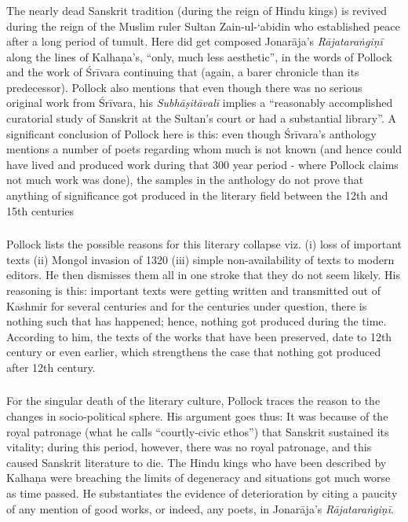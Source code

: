 \subsubsection{} The nearly dead Sanskrit tradition (during the reign of Hindu kings) is revived during the reign of the Muslim ruler Sultan Zain-ul-‘abidin who established peace after a long period of tumult. Here did get composed Jonarāja’s {\sl Rājataraṅgiṇī} along the lines of Kalhaṇa’s, “only, much less aesthetic”, in the words of Pollock and the work of Śrīvara continuing that (again, a barer chronicle than its predecessor). Pollock also mentions that even though there was no serious original work from Śrīvara, his {\sl Subhāṣitāvalī} implies a “reasonably accomplished curatorial study of Sanskrit at the Sultan’s court or had a substantial library”. A significant conclusion of Pollock here is this: even though Śrīvara’s anthology mentions a number of poets regarding whom much is not known (and hence could have lived and produced work during that 300 year period - where Pollock claims not much work was done), the samples in the anthology do not prove that anything of significance got produced in the literary field between the 12th and 15th centuries

\subsubsection{} Pollock lists the possible reasons for this literary collapse viz. (i) loss of important texts (ii) Mongol invasion of 1320 (iii) simple non-availability of texts to modern editors. He then dismisses them all in one stroke that they do not seem likely. His reasoning is this: important texts were getting written and transmitted out of Kashmir for several centuries and for the centuries under question, there is nothing such that has happened; hence, nothing got produced during the time. According to him, the texts of the works that have been preserved, date to 12th century or even earlier, which strengthens the case that nothing got produced after 12th century.

\subsubsection{} For the singular death of the literary culture, Pollock traces the reason to the changes in socio-political sphere. His argument goes thus: It was because of the royal patronage (what he calls “courtly-civic ethos”) that Sanskrit sustained its vitality; during this period, however, there was no royal patronage, and this caused Sanskrit literature to die. The Hindu kings who have been described by Kalhaṇa were breaching the limits of degeneracy and situations got much worse as time passed. He substantiates the evidence of deterioration by citing a paucity of any mention of good works, or indeed, any poets, in Jonarāja’s {\sl Rājataraṅgiṇī}.

